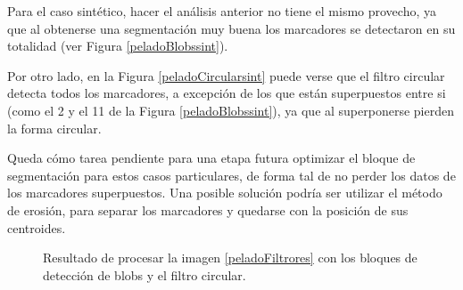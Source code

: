 Para el caso sintético, hacer el análisis anterior no tiene el mismo provecho, ya que al obtenerse una segmentación muy buena los marcadores se detectaron en su totalidad (ver Figura \ref{peladoBlobssint}). 

Por otro lado, en la Figura \ref{peladoCircularsint} puede verse que el filtro circular detecta todos los marcadores, a excepción de los que están superpuestos entre si (como el 2 y el 11 de la Figura \ref{peladoBlobssint}), ya que al superponerse pierden la forma circular.

 Queda cómo tarea pendiente para una etapa futura optimizar el bloque de segmentación para estos casos particulares, de forma tal de no perder los datos de los marcadores superpuestos. Una posible solución podría ser utilizar el método de erosión, para separar los marcadores y quedarse con la posición de sus centroides.

\begin{figure}[H]
        \hspace{-1cm}
         \hspace{1 mm}
  \caption{Resultado de procesar la imagen \ref{peladoFiltrores} con los bloques de detección de blobs y el filtro circular.}
      \label{detectMarcadoresSinteticos}
\end{figure}

